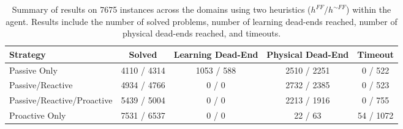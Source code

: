 \documentclass[letterpaper]{article}
\begin{document}
\begin{table*}\centering\begin{tabular}{|l|cccc|}\hline																	
Strategy	&	Solved			&	Learning Dead-End			&	Physical Dead-End			&	Timeout		
\\\hline\hline Passive Only	&	4110	/	4314	&	1053	/	588	&	2510	/	2251	&	0	/	522	\\
Passive/Reactive	&	4934	/	4766	&	0	/	0	&	2732	/	2385	&	0	/	523	\\
Passive/Reactive/Proactive	&	5439	/	5004	&	0	/	0	&	2213	/	1916	&	0	/
755	\\ Proactive Only	&	7531	/	6537	&	0	/	0	&	22	/	63	&	54	/	1072	\\\hline
\end{tabular}	\caption{\label{tab:t1} Summary of results on 7675 instances
across the domains using two heuristics ($h^{FF}/h^{\sim FF}$) within the agent. 
Results include the number of solved problems, number of learning dead-ends reached, number of physical dead-ends reached, and timeouts.}	\end{table*}
\end{document}
